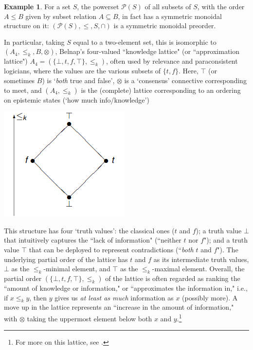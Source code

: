\documentclass[a4paper]{book}
\theoremstyle{definition}
\newtheorem{example}{Example}[section]
\theoremstyle{definition}
\theoremstyle{definition}
\theoremstyle{theorem}
\theoremstyle{definition}
\begin{document}
\begin{example}
	For a set $S$, the powerset $\mathcal{P}(S)$ of all subsets of $S$, with the order $A \leq B$ given by subset relation $A \subseteq  B$, in fact has a symmetric monoidal structure on it: $(\mathcal{P}(S), \leq, S, \cap)$ is a symmetric monoidal preorder. \par 
	In particular, taking $S$ equal to a two-element set, this is isomorphic to $(A_4, \leq_k, B, \otimes)$, Belnap's four-valued ``knowledge lattice" (or ``approximation lattice") $A_4 = (\{\bot, t, f, \top\}, \leq_k)$, often used by relevance and paraconsistent logicians, where the values are the various subsets of $\{t,f\}$. Here, $\top$ (or sometimes $B$) is `\textit{both} true and false', $\otimes$ is a `consensus' connective corresponding to meet, and $(A_4, \leqslant_k)$ is the (complete) lattice corresponding to an ordering on epistemic states (`how much info/knowledge')
	\begin{center}
		\includegraphics[scale=0.4]{L4.png}
	\end{center}
This structure has four `truth values': the classical ones ($t$ and $f$); a truth value $\bot$ that intuitively captures the ``lack of information" (``neither $t$ nor $f$"); and a truth value $\top$ that can be deployed to represent contradictions (``\textit{both} $t$ and $f$"). The underlying partial order of the lattice has $t$ and $f$ as its intermediate truth values, $\bot$ as the $\leq_k$-minimal element, and $\top$ as the $\leq_k$-maximal element. Overall, the partial order $(\{\bot, t, f, \top\}, \leq_k)$ of the lattice is often regarded as ranking the ``amount of knowledge or information," or ``approximates the information in," i.e., if $x \leq_k y$, then $y$ gives us \textit{at least as much} information as $x$ (possibly more). A move up in the lattice represents an ``increase in the amount of information," with $\otimes$ taking the uppermost element below both $x$ and $y$.\footnote{For more on this lattice, see \cite{belnap_how_1992}.} 
\end{example}
\end{document}
